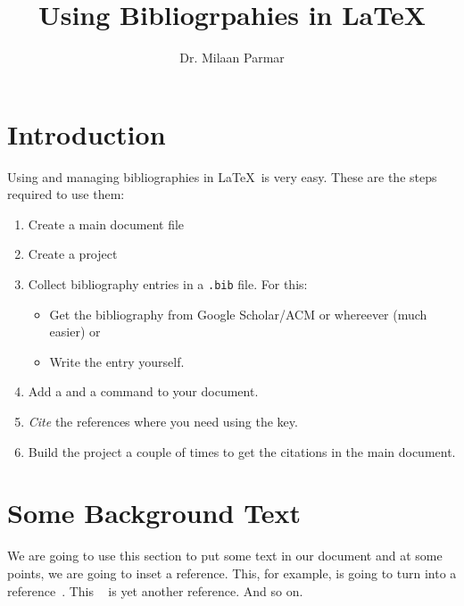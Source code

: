 \documentclass{article}
\begin{document}
\title{Using Bibliogrpahies in \LaTeX}
\author{Dr. Milaan Parmar}
\maketitle


\section{Introduction} 
Using and managing bibliographies in \LaTeX\ is very easy. These are the steps required to use them: 

\begin{enumerate}
	\item Create a main document file 
	\item Create a project
	\item Collect bibliography entries in a \verb|.bib| file. For this: 
	   \begin{itemize}
	     \item Get the bibliography from Google Scholar/ACM or whereever (much easier) or 
	     \item Write the entry yourself. 
     \end{itemize}
	\item Add a \verb|| and a \verb|| command to your document. 
	\item \emph{Cite} the references where you need using the key. 
	\item Build the project a couple of times to get the citations in the main document. 
\end{enumerate}

\section{Some Background Text}
We are going to use this section to put some text in our document and at some points, we are going to inset a reference. This, for example, is going to turn into a reference~\cite{se-cs-collab:nauman10}. This ~\cite{nauman2011using} is yet another reference. And so on.\cite{seo2011user}






\end{document}
